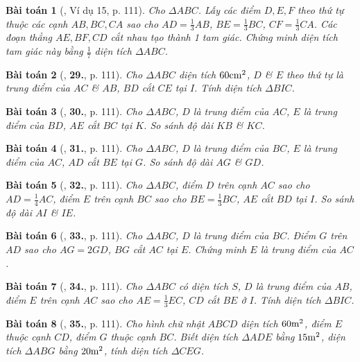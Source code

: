 \documentclass{article}
\numberwithin{equation}{section}
\newtheorem{baitoan}{Bài toán}[section]
\begin{document}
\begin{baitoan}[\cite{Binh_Toan_6_tap_1}, Ví dụ 15, p. 111]
	Cho $\Delta ABC$. Lấy các điểm $D,E,F$ theo thứ tự thuộc các cạnh $AB,BC,CA$ sao cho $AD = \frac{1}{3}AB$, $BE = \frac{1}{3}{BC}$, $CF = \frac{1}{3}CA$. Các đoạn thẳng $AE,BF,CD$ cắt nhau tạo thành 1 tam giác. Chứng minh diện tích tam giác này bằng $\frac{1}{7}$ diện tích $\Delta ABC$.
\end{baitoan}

\begin{baitoan}[\cite{Binh_Toan_6_tap_1}, \textbf{29.}, p. 111]
	Cho $\Delta ABC$ diện tích $60{\rm cm}^2$, $D$ \& $E$ theo thứ tự là trung điểm của $AC$ \& $AB$, $BD$ cắt $CE$ tại $I$. Tính diện tích $\Delta BIC$.
\end{baitoan}

\begin{baitoan}[\cite{Binh_Toan_6_tap_1}, \textbf{30.}, p. 111]
	Cho $\Delta ABC$, $D$ là trung điểm của $AC$, $E$ là trung điểm của $BD$, $AE$ cắt $BC$ tại $K$. So sánh độ dài $KB$ \& $KC$.
\end{baitoan}

\begin{baitoan}[\cite{Binh_Toan_6_tap_1}, \textbf{31.}, p. 111]
	Cho $\Delta ABC$, $D$ là trung điểm của $BC$, $E$ là trung điểm của $AC$, $AD$ cắt $BE$ tại $G$. So sánh độ dài $AG$ \& $GD$.
\end{baitoan}

\begin{baitoan}[\cite{Binh_Toan_6_tap_1}, \textbf{32.}, p. 111]
	Cho $\Delta ABC$, điểm $D$ trên cạnh $AC$ sao cho $AD = \frac{1}{4}AC$, điểm $E$ trên cạnh $BC$ sao cho $BE = \frac{1}{3}BC$, $AE$ cắt $BD$ tại $I$. So sánh độ dài $AI$ \& $IE$.
\end{baitoan}

\begin{baitoan}[\cite{Binh_Toan_6_tap_1}, \textbf{33.}, p. 111]
	Cho $\Delta ABC$, $D$ là trung điểm của $BC$. Điểm $G$ trên $AD$ sao cho $AG = 2GD$, $BG$ cắt $AC$ tại $E$. Chứng minh $E$ là trung điểm của $AC$.
\end{baitoan}

\begin{baitoan}[\cite{Binh_Toan_6_tap_1}, \textbf{34.}, p. 111]
	Cho $\Delta ABC$ có diện tích $S$, $D$ là trung điểm của $AB$, điểm $E$ trên cạnh $AC$ sao cho $AE = \frac{1}{3}EC$, $CD$ cắt $BE$ ở $I$. Tính diện tích $\Delta BIC$.
\end{baitoan}

\begin{baitoan}[\cite{Binh_Toan_6_tap_1}, \textbf{35.}, p. 111]
	Cho hình chữ nhật $ABCD$ diện tích $\rm60m^2$, điểm $E$ thuộc cạnh $CD$, điểm $G$ thuộc cạnh $BC$. Biết diện tích $\Delta ADE$ bằng $\rm15m^2$, diện tích $\Delta ABG$ bằng $\rm20m^2$, tính diện tích $\Delta CEG$.
\end{baitoan}
\end{document}
